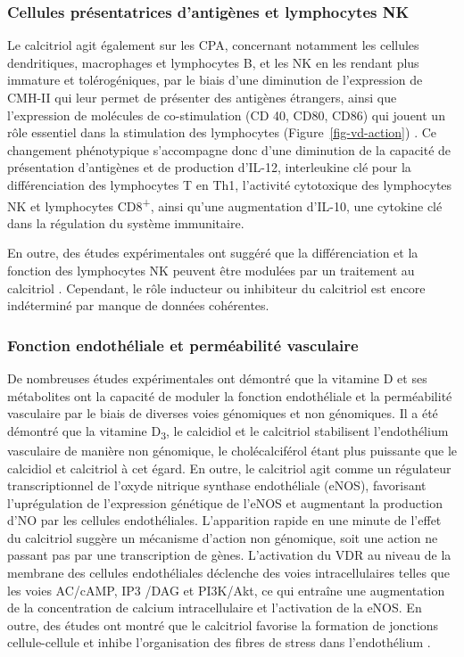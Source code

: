 \documentclass[
  a4paper,
  DIV=11,
  numbers=noendperiod,
  listof=totoc]{scrreprt}
\begin{document}
\subsubsection{Cellules présentatrices d'antigènes et lymphocytes
NK}\label{cellules-pruxe9sentatrices-dantiguxe8nes-et-lymphocytes-nk}

Le calcitriol agit également sur les \ac{CPA}, concernant notamment les
cellules dendritiques, macrophages et lymphocytes B, et les \ac{NK} en
les rendant plus immature et tolérogéniques, par le biais d'une
diminution de l'expression de \ac{CMH-II} qui leur permet de présenter
des antigènes étrangers, ainsi que l'expression de molécules de
co-stimulation (\ac{CD} 40, CD80, CD86) qui jouent un rôle essentiel
dans la stimulation des lymphocytes (Figure~\ref{fig-vd-action})
\autocite{Charoenngam.2020,Meza-Meza.2022,Caprio.2017}. Ce changement
phénotypique s'accompagne donc d'une diminution de la capacité de
présentation d'antigènes et de production d'\ac{IL-12}, interleukine clé
pour la différenciation des lymphocytes T en Th1, l'activité cytotoxique
des lymphocytes \ac{NK} et lymphocytes CD8\textsuperscript{+}, ainsi
qu'une augmentation d'\ac{IL-10}, une cytokine clé dans la régulation du
système immunitaire.

En outre, des études expérimentales ont suggéré que la différenciation
et la fonction des lymphocytes \ac{NK} peuvent être modulées par un
traitement au calcitriol \autocite{Charoenngam.2020}. Cependant, le rôle
inducteur ou inhibiteur du calcitriol est encore indéterminé par manque
de données cohérentes.

\subsubsection{Fonction endothéliale et perméabilité
vasculaire}\label{fonction-endothuxe9liale-et-permuxe9abilituxe9-vasculaire}

De nombreuses études expérimentales ont démontré que la vitamine D et
ses métabolites ont la capacité de moduler la fonction endothéliale et
la perméabilité vasculaire par le biais de diverses voies génomiques et
non génomiques. Il a été démontré que la vitamine D\textsubscript{3}, le
calcidiol et le calcitriol stabilisent l'endothélium vasculaire de
manière non génomique, le cholécalciférol étant plus puissante que le
calcidiol et calcitriol à cet égard. En outre, le calcitriol agit comme
un régulateur transcriptionnel de l'oxyde nitrique synthase endothéliale
(\acs{eNOS}), favorisant l'uprégulation de l'expression
génétique de l'\ac{eNOS} et augmentant la production d'\ac{NO} par les
cellules endothéliales. L'apparition rapide en une minute de l'effet du
calcitriol suggère un mécanisme d'action non génomique, soit une action
ne passant pas par une transcription de gènes. L'activation du \ac{VDR}
au niveau de la membrane des cellules endothéliales déclenche des voies
intracellulaires telles que les voies AC/cAMP, IP3 /DAG et PI3K/Akt, ce
qui entraîne une augmentation de la concentration de calcium
intracellulaire et l'activation de la \ac{eNOS}. En outre, des études
ont montré que le calcitriol favorise la formation de jonctions
cellule-cellule et inhibe l'organisation des fibres de stress dans
l'endothélium \autocite{Charoenngam.2020}.
\end{document}
